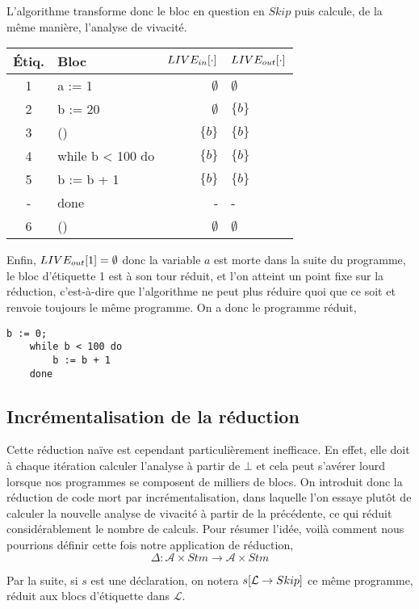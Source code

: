 \documentclass[a4paper, 12pt]{article}
\begin{document}
L'algorithme transforme donc le bloc en question en $Skip$ puis calcule, de la même manière, l'analyse de vivacité.
\begin{center}
	\begin{tabular}{||c|l|r|l||}
	\hline
	Étiq. & Bloc & $LIVE_{in}[\cdot]$ & $LIVE_{out}[\cdot]$ \\
	\hline
	1 & a := 1 & $\emptyset$ & $\emptyset$\\
	2 & b := 20 & $\emptyset$ & $\{b\}$\\
	3 & () & $\{b\}$ & $\{b\}$\\
	4 & while b < 100 do & $\{b\}$ & $\{b\}$\\
	5 & b := b + 1 & $\{b\}$ & $\{b\}$\\
	- & done & - & -\\
	6 & () & $\emptyset$ & $\emptyset$\\
	\hline
	\end{tabular}
\end{center}
Enfin, $LIVE_{out}[1] = \emptyset$ donc la variable $a$ est morte dans la suite du programme, le bloc d'étiquette 1 est à son tour
réduit, et l'on atteint un point fixe sur la réduction, c'est-à-dire que l'algorithme ne peut plus réduire quoi que ce soit et renvoie
toujours le même programme. On a donc le programme réduit,
\begin{lstlisting}[tabsize=2]
	b := 0;
	while b < 100 do
		b := b + 1
	done
\end{lstlisting}
\subsection{Incrémentalisation de la réduction}
Cette réduction naïve est cependant particulièrement inefficace. En effet, elle doit à chaque itération calculer
l'analyse à partir de $\bot$ et cela peut s'avérer lourd lorsque nos programmes se composent de milliers de blocs.
On introduit donc la réduction de code mort par incrémentalisation, dans laquelle l'on essaye plutôt de calculer
la nouvelle analyse de vivacité à partir de la précédente, ce qui réduit considérablement le nombre de calculs.
Pour résumer l'idée, voilà comment nous pourrions définir cette fois notre application de réduction,
\[\Delta : \mathcal{A} \times Stm \longrightarrow \mathcal{A} \times Stm \]
\noindent
\begin{notation}
	Par la suite, si $s$ est une déclaration, on notera $s[\mathcal{L} \rightarrow{Skip}]$ ce même programme, réduit aux blocs d'étiquette dans $\mathcal{L}$.
\end{notation}
\end{document}
